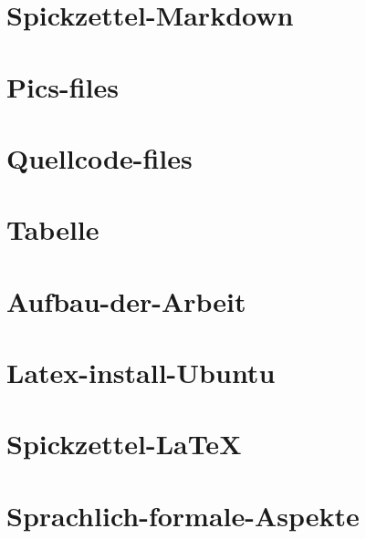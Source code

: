 %
%
\chapter{Spickzettel-Markdown}%

%
\chapter{Pics-files}%

%
\chapter{Quellcode-files}%

%
\chapter{Tabelle}%

%
\chapter{Aufbau-der-Arbeit}%

%
\chapter{Latex-install-Ubuntu}%

%
%
%
\chapter{Spickzettel-LaTeX}%

%
\chapter{Sprachlich-formale-Aspekte}%

%
